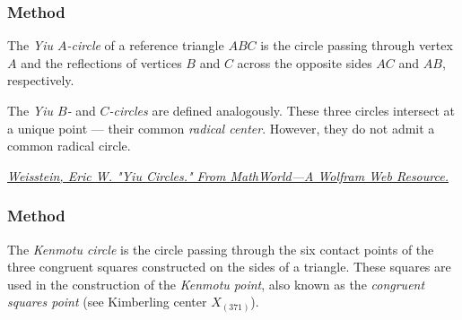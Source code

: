 \subsubsection{Method }
\label{ssub:method_yiu_circles}

The \emph{Yiu $A$-circle} of a reference triangle $ABC$ is the circle passing through vertex $A$ and the reflections of vertices $B$ and $C$ across the opposite sides $AC$ and $AB$, respectively.

The \emph{Yiu $B$-} and \emph{$C$-circles} are defined analogously. These three circles intersect at a unique point — their common \emph{radical center}. However, they do not admit a common radical circle.
\begin{flushright}
\small
\href{https://mathworld.wolfram.com/YiuCircles.html}
{\textit{Weisstein, Eric W. "Yiu Circles." From MathWorld—A Wolfram Web Resource.}}
\end{flushright}

\vspace{1em}

\begin{tkzexample}[latex=.5\textwidth]
\begin{center}
    \end{center}
\end{tkzexample}


\subsubsection{Method }
\label{ssub:kenmotu_circle}

The \emph{Kenmotu circle} is the circle passing through the six contact points of the three congruent squares constructed on the sides of a triangle. These squares are used in the construction of the \emph{Kenmotu point}, also known as the \emph{congruent squares point} (see Kimberling center $X_{(371)}$).

